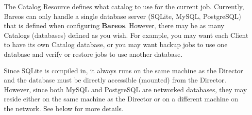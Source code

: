 The Catalog Resource defines what catalog to use for the current job.
Currently, Bareos can only handle a single database server (SQLite, MySQL,
PostgreSQL) that is defined when configuring {\bf Bareos}.  However, there
may be as many Catalogs (databases) defined as you wish.  For example, you
may want each Client to have its own Catalog database, or you may want
backup jobs to use one database and verify or restore jobs to use another
database.

Since SQLite is compiled in, it always runs on the same machine
as the Director and the database must be directly accessible (mounted) from
the Director.  However, since both MySQL and PostgreSQL are networked
databases, they may reside either on the same machine as the Director
or on a different machine on the network.  See below for more details.


